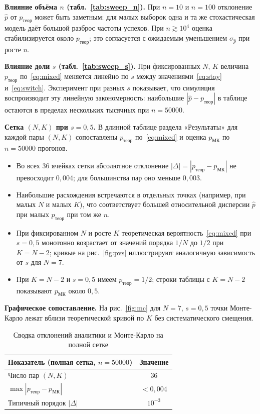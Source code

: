 \documentclass[a4paper, 14pt]{extarticle}
\begin{document}
\textbf{Влияние объёма $n$ (табл.~\ref{tab:sweep_n}).}
При $n=10$ и $n=100$ отклонение $\hat p$ от $p_{\text{теор}}$ может быть заметным: для малых выборок одна и та же стохастическая модель даёт большой разброс частоты успехов. При $n \gtrsim 10^4$ оценка стабилизируется около $p_{\text{теор}}$; это согласуется с ожидаемым уменьшением $\sigma_{\hat p}$ при росте $n$.

\textbf{Влияние доли $s$ (табл.~\ref{tab:sweep_s}).}
При фиксированных $N$, $K$ величина $p_{\text{теор}}$ по~\eqref{eq:mixed} меняется линейно по $s$ между значениями~\eqref{eq:stay} и~\eqref{eq:switch}. Эксперимент при разных $s$ показывает, что симуляция воспроизводит эту линейную закономерность: наибольшие $| \hat p - p_{\text{теор}} |$ в таблице остаются в пределах нескольких тысячных при $n=50000$.

\textbf{Сетка $(N,K)$ при $s=0{,}5$.}
В длинной таблице раздела «Результаты» для каждой пары $(N,K)$ сопоставлены $p_{\text{теор}}$ по~\eqref{eq:mixed} и оценка $p_{\text{МК}}$ по $n=50000$ прогонов.
\begin{itemize}[nosep]
  \item Во всех $36$ ячейках сетки абсолютное отклонение $|\Delta| = |p_{\text{теор}} - p_{\text{МК}}|$ не превосходит $0{,}004$; для большинства пар оно меньше $0{,}003$.
  \item Наибольшие расхождения встречаются в отдельных точках (например, при малых $N$ и малых $K$), что соответствует большей относительной дисперсии $\hat p$ при малых $p_{\text{теор}}$ при том же $n$.
  \item При фиксированном $N$ и росте $K$ теоретическая вероятность~\eqref{eq:mixed} при $s=0{,}5$ монотонно возрастает от значений порядка $1/N$ до $1/2$ при $K=N-2$; кривые на рис.~\ref{fig:pvs} иллюстрируют аналогичную зависимость от $s$ для $N=7$.
  \item При $K=N-2$ и $s=0{,}5$ имеем $p_{\text{теор}}=1/2$; строки таблицы с $K=N-2$ показывают $p_{\text{МК}}$ около $0{,}5$.
\end{itemize}

\textbf{Графическое сопоставление.}
На рис.~\ref{fig:mc} для $N=7$, $s=0{,}5$ точки Монте-Карло лежат вблизи теоретической кривой по $K$ без систематического смещения.

\begin{table}[H]
\centering
\begin{tabular}{|l|c|}
\hline
\textbf{Показатель (полная сетка, $n=50000$)} & \textbf{Значение} \\
\hline
Число пар $(N,K)$ & $36$ \\
\hline
$\max |p_{\text{теор}} - p_{\text{МК}}|$ & $< 0{,}004$ \\
\hline
Типичный порядок $|\Delta|$ & $10^{-3}$ \\
\hline
\end{tabular}
\caption{Сводка отклонений аналитики и Монте-Карло на полной сетке}
\label{tab:grid_summary}
\end{table}
\end{document}
